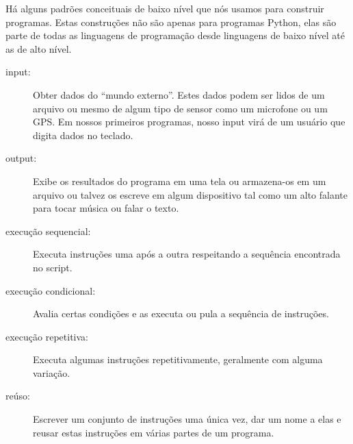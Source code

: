Há alguns padrões conceituais de baixo nível que nós usamos para construir programas. Estas
construções não são apenas para programas Python, elas são parte de todas as linguagens de
programação desde linguagens de baixo nível até as de alto nível.
%

\begin{description}
%

\item[input:] Obter dados do ``mundo externo''. Estes dados podem ser lidos
de um arquivo ou mesmo de algum tipo de sensor como um microfone ou um GPS.
Em nossos primeiros programas, nosso input virá de um usuário que digita
dados no teclado.
%

\item[output:] Exibe os resultados do programa em uma tela ou armazena-os
em um arquivo ou talvez os escreve em algum dispositivo tal como um
alto falante para tocar música ou falar o texto.
%

\item[execução sequencial:] Executa instruções uma após a outra
respeitando a sequência encontrada no script.
%

\item[execução condicional:] Avalia certas condições e as executa
ou pula a sequência de instruções.
%

\item[execução repetitiva:] Executa algumas instruções repetitivamente,
geralmente com alguma variação.
%

\item[reúso:] Escrever um conjunto de instruções uma única vez, dar um
nome a elas e reusar estas instruções em várias partes de um programa.
%

\end{description}
%

